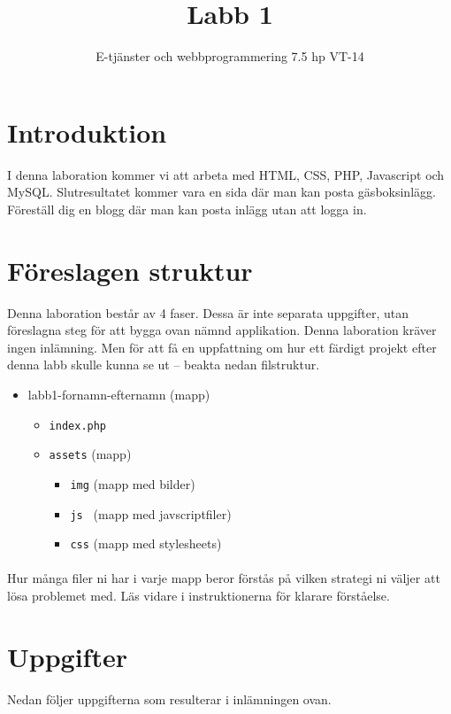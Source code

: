 \documentclass[12pt]{article}
\date{}
\title{ Labb 1 }
\author{ E-tjänster och webbprogrammering 7.5 hp VT-14 }
\begin{document}
\maketitle
\vspace{-2em}



\section{Introduktion}
I denna laboration kommer vi att arbeta med HTML, CSS, PHP, Javascript och MySQL. Slutresultatet kommer vara en sida där man kan posta gäsboksinlägg. Föreställ dig en blogg där man kan posta inlägg utan att logga in.

\section{Föreslagen struktur}
Denna laboration består av 4 faser. Dessa är inte separata uppgifter, utan föreslagna steg för att bygga ovan nämnd applikation. Denna laboration kräver ingen inlämning. Men för att få en uppfattning om hur ett färdigt projekt efter denna labb skulle kunna se ut -- beakta nedan filstruktur.
  \begin{itemize}
    \item labb1-fornamn-efternamn (mapp)
    \begin{itemize}
      \item \texttt{index.php} 
      \item \texttt{assets} (mapp)
      \begin{itemize}
        \item \texttt{img} (mapp med bilder)
        \item \texttt{js  } (mapp med javscriptfiler)
        \item \texttt{css} (mapp med stylesheets)
      \end{itemize}
    \end{itemize}
  \end{itemize}

\paragraph{}
Hur många filer ni har i varje mapp beror förstås på vilken strategi ni väljer att lösa problemet med. Läs vidare i instruktionerna för klarare förståelse.


\pagebreak
\section{Uppgifter}
Nedan följer uppgifterna som resulterar i inlämningen ovan.
\end{document}
